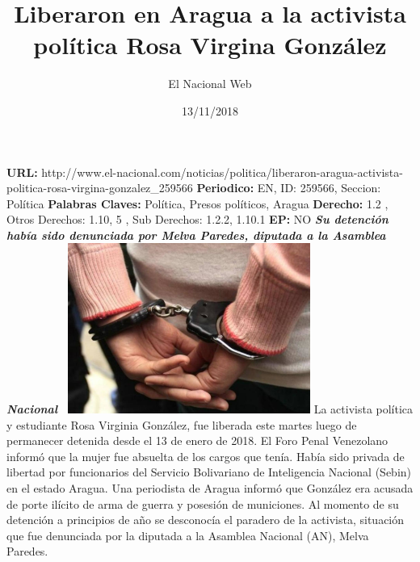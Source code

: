 \documentclass{article}%
\title{\textbf{Liberaron en Aragua a la activista política Rosa Virgina González}}%
\author{El Nacional Web}%
\date{13/11/2018}%
\begin{document}
%
\normalsize%
\maketitle%
\textbf{URL: }%
http://www.el{-}nacional.com/noticias/politica/liberaron{-}aragua{-}activista{-}politica{-}rosa{-}virgina{-}gonzalez\_259566\newline%
%
\textbf{Periodico: }%
EN, %
ID: %
259566, %
Seccion: %
Política\newline%
%
\textbf{Palabras Claves: }%
Política, Presos políticos, Aragua\newline%
%
\textbf{Derecho: }%
1.2%
, Otros Derechos: %
1.10, 5%
, Sub Derechos: %
1.2.2, 1.10.1%
\newline%
%
\textbf{EP: }%
NO\newline%
\newline%
%
\textbf{\textit{Su detención había sido denunciada por Melva Paredes, diputada a la Asamblea Nacional~}}%
\newline%
\newline%
%
\includegraphics[width=300px]{190.jpg}%
\newline%
%
La activista política y estudiante Rosa Virginia González, fue liberada este martes luego de permanecer detenida desde el 13 de enero de 2018.%
\newline%
%
El Foro Penal Venezolano informó que la mujer fue absuelta de los cargos que tenía. Había sido privada de libertad por funcionarios del Servicio Bolivariano de Inteligencia Nacional (Sebin) en el estado Aragua.%
\newline%
%
Una periodista de Aragua informó que González era acusada de porte ilícito de arma de guerra y posesión de municiones.%
\newline%
%
Al momento de su detención a principios de año se desconocía el paradero de la activista, situación que fue denunciada por la diputada a la Asamblea Nacional (AN), Melva Paredes.%
\newline%
%
\end{document}
